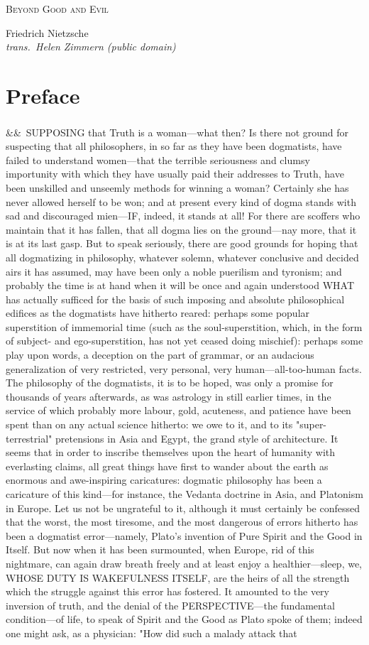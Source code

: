 \documentclass[12pt]{article}
\newcommand{\work}[1]{\begin{center}\LARGE\scshape #1\end{center}}
\newcommand{\attrib}[2]{\begin{center}\large #1\\[2pt]\small\itshape trans.\ #2\end{center}\vspace{1em}}
\newcommand{\para}[1][]{\par\noindent\ifx&#1&\else\textsuperscript{\footnotesize #1}~\fi}
\begin{document}
\work{Beyond Good and Evil}

\attrib{Friedrich Nietzsche}{Helen Zimmern (public domain)}

\section*{Preface}

\para SUPPOSING that Truth is a woman---what then? Is there not ground for suspecting that all philosophers, in so far as they have been dogmatists, have failed to understand women---that the terrible seriousness and clumsy importunity with which they have usually paid their addresses to Truth, have been unskilled and unseemly methods for winning a woman? Certainly she has never allowed herself to be won; and at present every kind of dogma stands with sad and discouraged mien---IF, indeed, it stands at all! For there are scoffers who maintain that it has fallen, that all dogma lies on the ground---nay more, that it is at its last gasp. But to speak seriously, there are good grounds for hoping that all dogmatizing in philosophy, whatever solemn, whatever conclusive and decided airs it has assumed, may have been only a noble puerilism and tyronism; and probably the time is at hand when it will be once and again understood WHAT has actually sufficed for the basis of such imposing and absolute philosophical edifices as the dogmatists have hitherto reared: perhaps some popular superstition of immemorial time (such as the soul-superstition, which, in the form of subject- and ego-superstition, has not yet ceased doing mischief): perhaps some play upon words, a deception on the part of grammar, or an audacious generalization of very restricted, very personal, very human---all-too-human facts. The philosophy of the dogmatists, it is to be hoped, was only a promise for thousands of years afterwards, as was astrology in still earlier times, in the service of which probably more labour, gold, acuteness, and patience have been spent than on any actual science hitherto: we owe to it, and to its "super-terrestrial" pretensions in Asia and Egypt, the grand style of architecture. It seems that in order to inscribe themselves upon the heart of humanity with everlasting claims, all great things have first to wander about the earth as enormous and awe-inspiring caricatures: dogmatic philosophy has been a caricature of this kind---for instance, the Vedanta doctrine in Asia, and Platonism in Europe. Let us not be ungrateful to it, although it must certainly be confessed that the worst, the most tiresome, and the most dangerous of errors hitherto has been a dogmatist error---namely, Plato's invention of Pure Spirit and the Good in Itself. But now when it has been surmounted, when Europe, rid of this nightmare, can again draw breath freely and at least enjoy a healthier---sleep, we, WHOSE DUTY IS WAKEFULNESS ITSELF, are the heirs of all the strength which the struggle against this error has fostered. It amounted to the very inversion of truth, and the denial of the PERSPECTIVE---the fundamental condition---of life, to speak of Spirit and the Good as Plato spoke of them; indeed one might ask, as a physician: "How did such a malady attack that 
\end{document}
